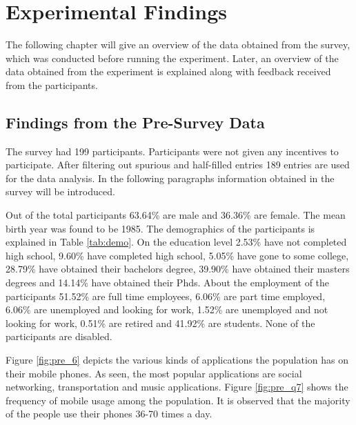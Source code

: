 \chapter{Experimental Findings}
The following chapter will give an overview of the data obtained from the survey, which was conducted before running the experiment.
Later, an overview of the data obtained from the experiment is explained along with feedback received from the participants.

\section{Findings from the Pre-Survey Data}
The survey had 199 participants. Participants were not given any incentives to participate. After filtering out spurious and half-filled entries 189 entries are used for the data analysis. In the following paragraphs information obtained in the survey will be introduced.

Out of the total
participants 63.64\% are male and 36.36\% are female. The mean birth year was found to be 1985. The demographics of the participants is explained in Table \ref{tab:demo}. On the education level 2.53\% have not completed high school, 9.60\% have completed high school, 5.05\% have gone to some college, 28.79\% have obtained their bachelors degree, 39.90\% have obtained their masters degrees and 14.14\% have obtained their Phds. About the employment of the participants 51.52\% are full time employees, 6.06\% are part time employed, 6.06\% are unemployed and looking for work, 1.52\% are unemployed and not looking for work, 0.51\% are retired and 41.92\% are students. None of the participants are disabled. 

Figure \ref{fig:pre_6} depicts the various kinds of applications the population has on their mobile phones. As seen, the most popular applications are social networking, transportation and music applications. Figure \ref{fig:pre_q7} shows the frequency of mobile usage among the population. It is observed that the majority of the people use their phones 36-70 times a day.

